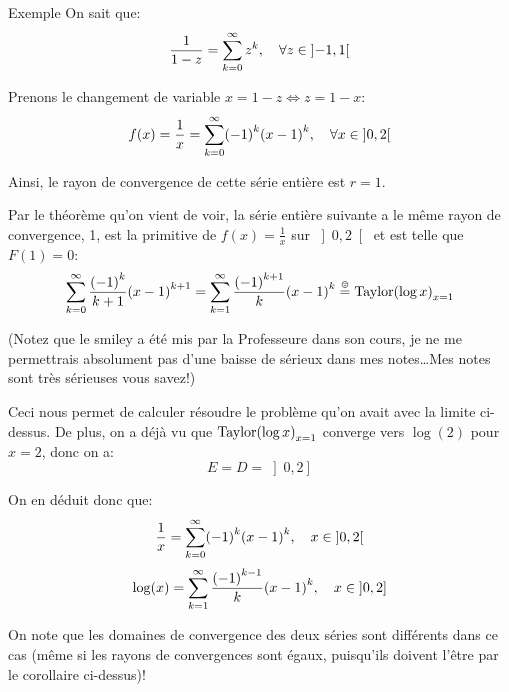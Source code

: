 \documentclass[a4paper]{article}
\begin{document}
\begin{parag}{Exemple}
    On sait que: 
    \[\frac{1}{1 - z} = \sum_{k=0}^{\infty} z^k, \mathspace \forall z \in \left]-1, 1\right[ \]

    Prenons le changement de variable $x = 1 - z \iff z = 1 - x$: 
    \[f\left(x\right) = \frac{1}{x} = \sum_{k=0}^{\infty} \left(-1\right)^{k} \left(x - 1\right)^k, \mathspace \forall x \in \left]0, 2\right[ \]
    
    Ainsi, le rayon de convergence de cette série entière est $r = 1$.

    Par le théorème qu'on vient de voir, la série entière suivante a le même rayon de convergence, 1, est la primitive de $f\left(x\right) = \frac{1}{x}$ sur $\left]0, 2\right[ $ et est telle que $F\left(1\right) = 0$:
    \[\sum_{k=0}^{\infty} \frac{\left(-1\right)^k}{k+1} \left(x - 1\right)^{k+1} = \sum_{k=1}^{\infty} \frac{\left(-1\right)^{k+1}}{k} \left(x - 1\right)^k \over{=}{\smiley} \Taylor\left(\log x\right)_{x = 1}\]

    (Notez que le smiley a été mis par la Professeure dans son cours, je ne me permettrais absolument pas d'une baisse de sérieux dans mes notes\ldots Mes notes sont très sérieuses vous savez!)

    Ceci nous permet de calculer résoudre le problème qu'on avait avec la limite ci-dessus. De plus, on a déjà vu que $\Taylor\left(\log x\right)_{x = 1}$ converge vers $\log\left(2\right)$ pour $x = 2$, donc on a: 
    \[E = D = \left]0, 2\right] \]

    On en déduit donc que: 
    \[\frac{1}{x} = \sum_{k=0}^{\infty} \left(-1\right)^k \left(x - 1\right)^k, \mathspace x \in \left]0, 2\right[ \]
    \[\log\left(x\right) = \sum_{k=1}^{\infty} \frac{\left(-1\right)^{k-1}}{k} \left(x - 1\right)^k, \mathspace x \in \left]0, 2\right] \]

    On note que les domaines de convergence des deux séries sont différents dans ce cas (même si les rayons de convergences sont égaux, puisqu'ils doivent l'être par le corollaire ci-dessus)!
\end{parag}
\end{document}
